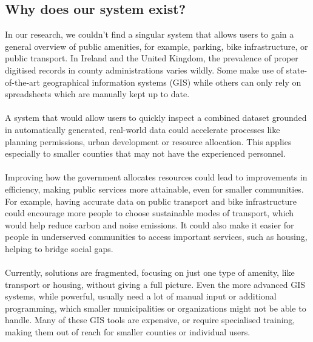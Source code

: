 \subsection{Why does our system exist?}
In our research, we couldn't find a singular system that allows users to gain a general overview of public amenities, for example, parking, 
bike infrastructure, or public transport.
In Ireland and the United Kingdom, the prevalence of proper digitised records in county administrations varies wildly.
Some make use of state-of-the-art geographical information systems (GIS) while others can only rely on spreadsheets which are manually kept up to date.
\\ \\
A system that would allow users to quickly inspect a combined dataset grounded in automatically generated, real-world data could accelerate processes 
like planning permissions, urban development or resource allocation.
This applies especially to smaller counties that may not have the experienced personnel.
\\ \\
Improving how the government allocates resources could lead to improvements in efficiency, making public services more attainable, even for smaller communities.
For example, having accurate data on public transport and bike infrastructure could encourage more people to choose sustainable modes of transport, which would help reduce carbon and noise emissions. 
It could also make it easier for people in underserved communities to access important services, such as housing, helping to bridge social gaps.
\\ \\
Currently, solutions are fragmented, focusing on just one type of amenity, like transport or housing, without giving a full picture.
Even the more advanced GIS systems, while powerful, usually need a lot of manual input or additional programming, which smaller municipalities or organizations might not be able to handle.
Many of these GIS tools are expensive, or require specialised training, making them out of reach for smaller counties or individual users.

